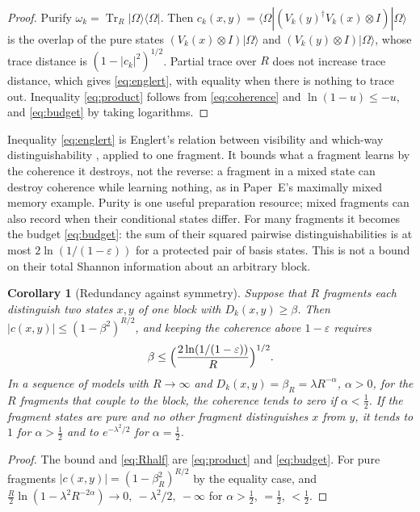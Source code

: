 \documentclass[12pt,a4paper]{article}
\newtheorem{corollary}[theorem]{Corollary}
\newcommand{\ket}[1]{|#1\rangle}
\newcommand{\proj}[1]{|#1\rangle\!\langle #1|}
\newcommand{\Tr}{\operatorname{Tr}}
\begin{document}
\begin{proof}
Purify $\omega_k=\Tr_R\proj{\Omega}$. Then $c_k(x,y)=\langle\Omega|(V_k(y)^\dagger V_k(x)\otimes I)|\Omega\rangle$ is the overlap of the pure states $(V_k(x)\otimes I)\ket\Omega$ and $(V_k(y)\otimes I)\ket\Omega$, whose trace distance is $(1-|c_k|^2)^{1/2}$. Partial trace over $R$ does not increase trace distance, which gives \eqref{eq:englert}, with equality when there is nothing to trace out. Inequality \eqref{eq:product} follows from \eqref{eq:coherence} and $\ln(1-u)\le-u$, and \eqref{eq:budget} by taking logarithms.
\end{proof}

Inequality \eqref{eq:englert} is Englert's relation between visibility and which-way distinguishability \cite{Englert1996}, applied to one fragment. It bounds what a fragment learns by the coherence it destroys, not the reverse: a fragment in a mixed state can destroy coherence while learning nothing, as in Paper~E's maximally mixed memory example. Purity is one useful preparation resource; mixed fragments can also record when their conditional states differ. For many fragments it becomes the budget \eqref{eq:budget}: the sum of their squared pairwise distinguishabilities is at most $2\ln(1/(1-\varepsilon))$ for a protected pair of basis states. This is not a bound on their total Shannon information about an arbitrary block.

\begin{corollary}[Redundancy against symmetry]
\label{cor:threshold}
Suppose that $R$ fragments each distinguish two states $x,y$ of one block with $D_k(x,y)\ge\beta$. Then $|c(x,y)|\le(1-\beta^2)^{R/2}$, and keeping the coherence above $1-\varepsilon$ requires
\begin{equation}
\beta\le\Bigl(\frac{2\ln(1/(1-\varepsilon))}{R}\Bigr)^{1/2}.
\label{eq:Rhalf}
\end{equation}
In a sequence of models with $R\to\infty$ and $D_k(x,y)=\beta_R=\lambda R^{-\alpha}$, $\alpha>0$, for the $R$ fragments that couple to the block, the coherence tends to zero if $\alpha<\tfrac12$. If the fragment states are pure and no other fragment distinguishes $x$ from $y$, it tends to $1$ for $\alpha>\tfrac12$ and to $e^{-\lambda^2/2}$ for $\alpha=\tfrac12$.
\end{corollary}

\begin{proof}
The bound and \eqref{eq:Rhalf} are \eqref{eq:product} and \eqref{eq:budget}. For pure fragments $|c(x,y)|=(1-\beta_R^2)^{R/2}$ by the equality case, and $\frac R2\ln(1-\lambda^2R^{-2\alpha})\to0,\ -\lambda^2/2,\ -\infty$ for $\alpha>\frac12$, $=\frac12$, $<\frac12$.
\end{proof}
\end{document}
